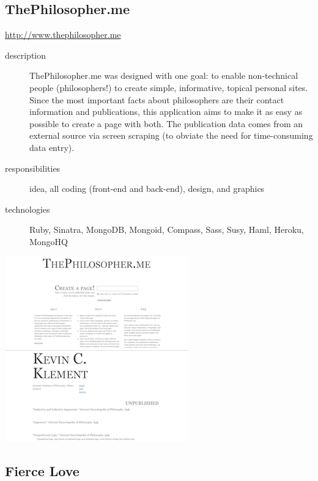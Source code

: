 \documentclass{article}
\begin{document}
\subsection{ThePhilosopher.me} %
\label{sub:ThePhilosopher.me}

\href{http://www.thephilosopher.me}{http://www.thephilosopher.me}

\begin{description}
  \item[description] ThePhilosopher.me was designed with one goal: to 
    enable non-technical people (philosophers!) to create simple, 
    informative, topical personal sites.  Since the most important 
    facts about philosophers are their contact information and 
    publications, this application aims to make it as easy as possible 
    to create a page with both.  The publication data comes from an 
    external source via screen scraping (to obviate the need for 
    time-consuming data entry).
  \item[responsibilities] idea, all coding (front-end and back-end), 
    design, and graphics
  \item[technologies] Ruby, Sinatra, MongoDB, Mongoid, Compass, Sass, 
    Susy, Haml, Heroku, MongoHQ
\end{description}

\includegraphics[scale=.5]{../source/images/portfolio/philosopher.me-home-sm.png}
\includegraphics[scale=.5]{../source/images/portfolio/philosopher.me-sample-sm.png}

\subsection{Fierce Love} %
\label{sub:Fierce Love}
\end{document}

